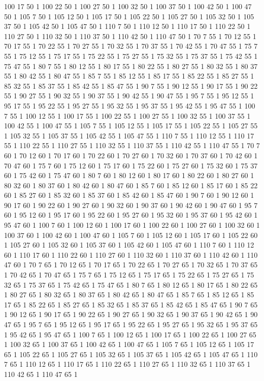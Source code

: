 100 17 50 1
100 22 50 1
100 27 50 1
100 32 50 1
100 37 50 1
100 42 50 1
100 47 50 1
105 7 50 1
105 12 50 1
105 17 50 1
105 22 50 1
105 27 50 1
105 32 50 1
105 37 50 1
105 42 50 1
105 47 50 1
110 7 50 1
110 12 50 1
110 17 50 1
110 22 50 1
110 27 50 1
110 32 50 1
110 37 50 1
110 42 50 1
110 47 50 1
70 7 55 1
70 12 55 1
70 17 55 1
70 22 55 1
70 27 55 1
70 32 55 1
70 37 55 1
70 42 55 1
70 47 55 1
75 7 55 1
75 12 55 1
75 17 55 1
75 22 55 1
75 27 55 1
75 32 55 1
75 37 55 1
75 42 55 1
75 47 55 1
80 7 55 1
80 12 55 1
80 17 55 1
80 22 55 1
80 27 55 1
80 32 55 1
80 37 55 1
80 42 55 1
80 47 55 1
85 7 55 1
85 12 55 1
85 17 55 1
85 22 55 1
85 27 55 1
85 32 55 1
85 37 55 1
85 42 55 1
85 47 55 1
90 7 55 1
90 12 55 1
90 17 55 1
90 22 55 1
90 27 55 1
90 32 55 1
90 37 55 1
90 42 55 1
90 47 55 1
95 7 55 1
95 12 55 1
95 17 55 1
95 22 55 1
95 27 55 1
95 32 55 1
95 37 55 1
95 42 55 1
95 47 55 1
100 7 55 1
100 12 55 1
100 17 55 1
100 22 55 1
100 27 55 1
100 32 55 1
100 37 55 1
100 42 55 1
100 47 55 1
105 7 55 1
105 12 55 1
105 17 55 1
105 22 55 1
105 27 55 1
105 32 55 1
105 37 55 1
105 42 55 1
105 47 55 1
110 7 55 1
110 12 55 1
110 17 55 1
110 22 55 1
110 27 55 1
110 32 55 1
110 37 55 1
110 42 55 1
110 47 55 1
70 7 60 1
70 12 60 1
70 17 60 1
70 22 60 1
70 27 60 1
70 32 60 1
70 37 60 1
70 42 60 1
70 47 60 1
75 7 60 1
75 12 60 1
75 17 60 1
75 22 60 1
75 27 60 1
75 32 60 1
75 37 60 1
75 42 60 1
75 47 60 1
80 7 60 1
80 12 60 1
80 17 60 1
80 22 60 1
80 27 60 1
80 32 60 1
80 37 60 1
80 42 60 1
80 47 60 1
85 7 60 1
85 12 60 1
85 17 60 1
85 22 60 1
85 27 60 1
85 32 60 1
85 37 60 1
85 42 60 1
85 47 60 1
90 7 60 1
90 12 60 1
90 17 60 1
90 22 60 1
90 27 60 1
90 32 60 1
90 37 60 1
90 42 60 1
90 47 60 1
95 7 60 1
95 12 60 1
95 17 60 1
95 22 60 1
95 27 60 1
95 32 60 1
95 37 60 1
95 42 60 1
95 47 60 1
100 7 60 1
100 12 60 1
100 17 60 1
100 22 60 1
100 27 60 1
100 32 60 1
100 37 60 1
100 42 60 1
100 47 60 1
105 7 60 1
105 12 60 1
105 17 60 1
105 22 60 1
105 27 60 1
105 32 60 1
105 37 60 1
105 42 60 1
105 47 60 1
110 7 60 1
110 12 60 1
110 17 60 1
110 22 60 1
110 27 60 1
110 32 60 1
110 37 60 1
110 42 60 1
110 47 60 1
70 7 65 1
70 12 65 1
70 17 65 1
70 22 65 1
70 27 65 1
70 32 65 1
70 37 65 1
70 42 65 1
70 47 65 1
75 7 65 1
75 12 65 1
75 17 65 1
75 22 65 1
75 27 65 1
75 32 65 1
75 37 65 1
75 42 65 1
75 47 65 1
80 7 65 1
80 12 65 1
80 17 65 1
80 22 65 1
80 27 65 1
80 32 65 1
80 37 65 1
80 42 65 1
80 47 65 1
85 7 65 1
85 12 65 1
85 17 65 1
85 22 65 1
85 27 65 1
85 32 65 1
85 37 65 1
85 42 65 1
85 47 65 1
90 7 65 1
90 12 65 1
90 17 65 1
90 22 65 1
90 27 65 1
90 32 65 1
90 37 65 1
90 42 65 1
90 47 65 1
95 7 65 1
95 12 65 1
95 17 65 1
95 22 65 1
95 27 65 1
95 32 65 1
95 37 65 1
95 42 65 1
95 47 65 1
100 7 65 1
100 12 65 1
100 17 65 1
100 22 65 1
100 27 65 1
100 32 65 1
100 37 65 1
100 42 65 1
100 47 65 1
105 7 65 1
105 12 65 1
105 17 65 1
105 22 65 1
105 27 65 1
105 32 65 1
105 37 65 1
105 42 65 1
105 47 65 1
110 7 65 1
110 12 65 1
110 17 65 1
110 22 65 1
110 27 65 1
110 32 65 1
110 37 65 1
110 42 65 1
110 47 65 1
